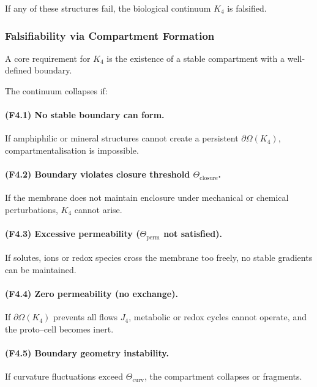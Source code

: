 If any of these structures fail, the biological continuum $K_4$ is
falsified.



\subsubsection{Falsifiability via Compartment Formation}

A core requirement for $K_4$ is the existence of a stable compartment
with a well-defined boundary.

The continuum collapses if:

\paragraph{(F4.1) No stable boundary can form.}
If amphiphilic or mineral structures cannot create a persistent
$\partial\Omega(K_4)$, compartmentalisation is impossible.

\paragraph{(F4.2) Boundary violates closure threshold $\Theta_{\mathrm{closure}}$.}
If the membrane does not maintain enclosure under mechanical or chemical
perturbations, $K_4$ cannot arise.

\paragraph{(F4.3) Excessive permeability ($\Theta_{\mathrm{perm}}$ not satisfied).}
If solutes, ions or redox species cross the membrane too freely,
no stable gradients can be maintained.

\paragraph{(F4.4) Zero permeability (no exchange).}
If $\partial\Omega(K_4)$ prevents all flows $J_4$, metabolic or redox
cycles cannot operate, and the proto–cell becomes inert.

\paragraph{(F4.5) Boundary geometry instability.}
If curvature fluctuations exceed $\Theta_{\mathrm{curv}}$,
the compartment collapses or fragments.

